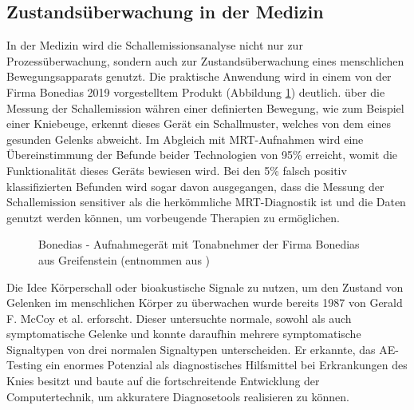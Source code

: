 \documentclass[twoside, 12pt, a4paper]{article}
\begin{document}
	\subsection{Zustands\"uberwachung in der Medizin}
	
	In der Medizin wird die Schallemissionsanalyse nicht nur zur Prozess\"uberwachung, sondern auch zur Zustands\"uberwachung eines menschlichen Bewegungsapparats genutzt. Die praktische Anwendung wird in einem von der Firma Bonedias 2019 vorgestelltem Produkt (Abbildung \ref{img:Bonedias}) deutlich. \"uber die Messung der Schallemission w\"ahren einer definierten Bewegung, wie zum Beispiel einer Kniebeuge, erkennt dieses Ger\"at ein Schallmuster, welches von dem eines gesunden Gelenks abweicht. Im Abgleich mit MRT-Aufnahmen wird eine \"Ubereinstimmung der Befunde beider Technologien von 95\% erreicht, womit die Funktionalit\"at dieses Ger\"ats bewiesen wird. Bei den 5\% falsch positiv klassifizierten Befunden wird sogar davon ausgegangen, dass die Messung der Schallemission sensitiver als die herk\"ommliche MRT-Diagnostik ist und die Daten genutzt werden k\"onnen, um vorbeugende Therapien zu erm\"oglichen.~\cite{Oppermann.2019}  	
	
	\begin{figure}[!htt]
		\centering
		\setlength{\fboxsep}{0.5pt}
		\setlength{\fboxrule}{0.5pt}
		\caption[Bonedias]{Bonedias - Aufnahmeger\"at mit Tonabnehmer der Firma Bonedias aus Greifenstein (entnommen aus \cite{Oppermann.2019})}
		\label{img:Bonedias}
	\end{figure}
	\FloatBarrier
	
	
	Die Idee K\"orperschall oder bioakustische Signale zu nutzen, um den Zustand von Gelenken im menschlichen K\"orper zu \"uberwachen wurde bereits 1987 von Gerald F. McCoy et al. erforscht. Dieser untersuchte normale, sowohl als auch symptomatische Gelenke und konnte daraufhin mehrere symptomatische Signaltypen von drei normalen Signaltypen unterscheiden. Er erkannte, das AE-Testing ein enormes Potenzial als diagnostisches Hilfsmittel bei Erkrankungen des Knies besitzt und baute auf die fortschreitende Entwicklung der Computertechnik, um akkuratere Diagnosetools realisieren zu k\"onnen.~\cite{McCoy.1987}
	
\end{document}
